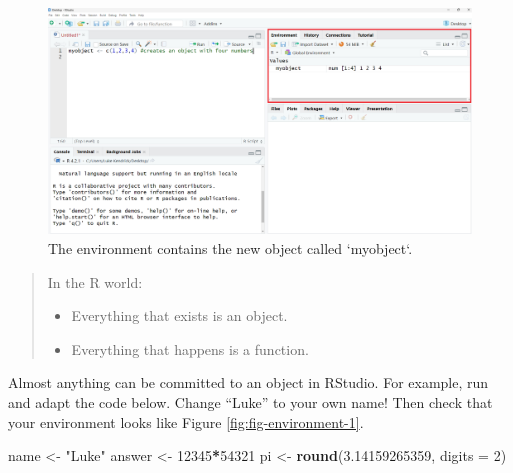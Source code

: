 \documentclass[
]{book}
\newenvironment{Shaded}{\begin{snugshade}}{\end{snugshade}}
\newcommand{\AttributeTok}[1]{\textcolor[rgb]{0.13,0.29,0.53}{#1}}
\newcommand{\DecValTok}[1]{\textcolor[rgb]{0.00,0.00,0.81}{#1}}
\newcommand{\FloatTok}[1]{\textcolor[rgb]{0.00,0.00,0.81}{#1}}
\newcommand{\FunctionTok}[1]{\textcolor[rgb]{0.13,0.29,0.53}{\textbf{#1}}}
\newcommand{\NormalTok}[1]{#1}
\newcommand{\OtherTok}[1]{\textcolor[rgb]{0.56,0.35,0.01}{#1}}
\newcommand{\SpecialCharTok}[1]{\textcolor[rgb]{0.81,0.36,0.00}{\textbf{#1}}}
\newcommand{\StringTok}[1]{\textcolor[rgb]{0.31,0.60,0.02}{#1}}
\begin{document}
\begin{figure}[H]

{\centering \includegraphics[width=1\linewidth]{images/object} 

}

\caption{The environment contains the new object called `myobject`.}\label{fig:fig-environment}
\end{figure}

\begin{quote}
In the R world:

\begin{itemize}
\item
  Everything that exists is an object.
\item
  Everything that happens is a function.
\end{itemize}
\end{quote}

Almost anything can be committed to an object in RStudio. For example, run and adapt the code below. Change ``Luke'' to your own name! Then check that your environment looks like Figure \ref{fig:fig-environment-1}.

\begin{Shaded}
\begin{Highlighting}[]
\NormalTok{name }\OtherTok{\textless{}{-}} \StringTok{"Luke"}
\NormalTok{answer }\OtherTok{\textless{}{-}} \DecValTok{12345}\SpecialCharTok{*}\DecValTok{54321}
\NormalTok{pi }\OtherTok{\textless{}{-}} \FunctionTok{round}\NormalTok{(}\FloatTok{3.14159265359}\NormalTok{, }\AttributeTok{digits =} \DecValTok{2}\NormalTok{)}
\end{Highlighting}
\end{Shaded}
\end{document}
